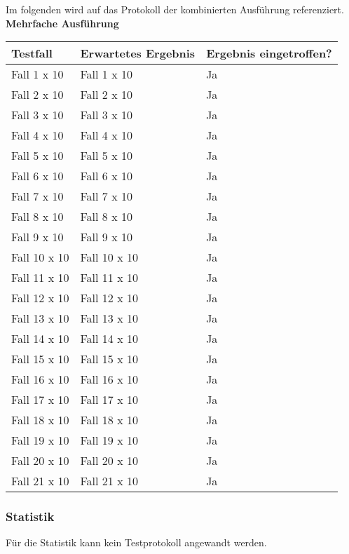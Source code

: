 \newpage
Im folgenden wird auf das Protokoll der kombinierten Ausführung referenziert.
\\
\textbf{Mehrfache Ausführung}
\\
\begin{tabularx}{\textwidth}{|X|X|l|}
    \hline
    \textbf{Testfall} & \textbf{Erwartetes Ergebnis} & \textbf{Ergebnis eingetroffen?}\\
    \hline
    Fall 1 x 10 & Fall 1 x 10 & Ja\\
    \hline
    Fall 2 x 10 & Fall 2 x 10 & Ja\\
    \hline
    Fall 3 x 10 & Fall 3 x 10 & Ja\\
    \hline
    Fall 4 x 10 & Fall 4 x 10 & Ja\\
    \hline
    Fall 5 x 10 & Fall 5 x 10 & Ja\\
    \hline
    Fall 6 x 10 & Fall 6 x 10 & Ja\\
    \hline
    Fall 7 x 10 & Fall 7 x 10 & Ja\\
    \hline
    Fall 8 x 10 & Fall 8 x 10 & Ja\\
    \hline
    Fall 9 x 10 & Fall 9 x 10 & Ja\\
    \hline
    Fall 10 x 10 & Fall 10 x 10 & Ja\\
    \hline
    Fall 11 x 10 & Fall 11 x 10 & Ja\\
    \hline
    Fall 12 x 10 & Fall 12 x 10 & Ja\\
    \hline
    Fall 13 x 10 & Fall 13 x 10 & Ja\\
    \hline
    Fall 14 x 10 & Fall 14 x 10 & Ja\\
    \hline
    Fall 15 x 10 & Fall 15 x 10 & Ja\\
    \hline
    Fall 16 x 10 & Fall 16 x 10 & Ja\\
    \hline
    Fall 17 x 10 & Fall 17 x 10 & Ja\\
    \hline
    Fall 18 x 10 & Fall 18 x 10 & Ja\\
    \hline
    Fall 19 x 10 & Fall 19 x 10 & Ja\\
    \hline
    Fall 20 x 10 & Fall 20 x 10 & Ja\\
    \hline
    Fall 21 x 10 & Fall 21 x 10 & Ja\\
    \hline
\end{tabularx}

\newpage
\subsubsection{Statistik}
Für die Statistik kann kein Testprotokoll angewandt werden.

